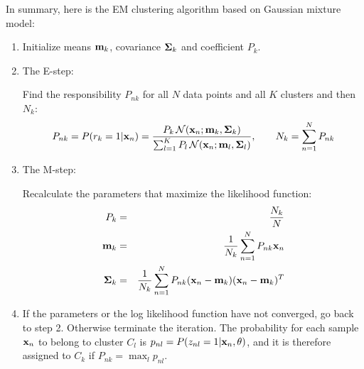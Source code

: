 \documentclass{article}
\begin{document}
In summary, here is the EM clustering algorithm based on Gaussian mixture model:
\begin{enumerate}
\item Initialize means ${\bf m}_k$, covariance ${\bf\Sigma}_k$ and coefficient
  $P_k$. 

\item The E-step: 

  Find the responsibility $P_{nk}$ for all $N$ data points and all 
  $K$ clusters and then $N_k$:
  \begin{equation}
    P_{nk}=P(r_k=1|{\bf x}_n)=\frac{P_k\,{\cal N}({\bf x}_n;{\bf m}_k,{\bf\Sigma}_k)}
    {\sum_{l=1}^K P_l\,{\cal N}({\bf x}_n;{\bf m}_l,{\bf\Sigma}_l)},
    \;\;\;\;\;\;\;N_k=\sum_{n=1}^N P_{nk}
  \end{equation}

\item The M-step: 

  Recalculate the parameters that maximize the likelihood function:
  \begin{eqnarray}
    P_k&=&\frac{N_k}{N}
    \nonumber\\
    {\bf m}_k&=&\frac{1}{N_k} \sum_{n=1}^N P_{nk}{\bf x}_n 
    \nonumber\\
    {\bf\Sigma}_k&=&\frac{1}{N_k}\sum_{n=1}^N P_{nk}({\bf x}_n-{\bf m}_k)({\bf x}_n-{\bf m}_k)^T
  \end{eqnarray}

\item If the parameters or the log likelihood function have not 
  converged, go back to step 2.  Otherwise terminate the iteration. 
  The probability for each sample ${\bf x}_n$ to belong to cluster 
  $C_l$ is $p_{nl}=P(z_{nl}=1|{\bf x}_n,\theta)$, and it is therefore
  assigned to $C_k$ if $P_{nk}=\max_l p_{nl}$.

\end{enumerate}
\end{document}
